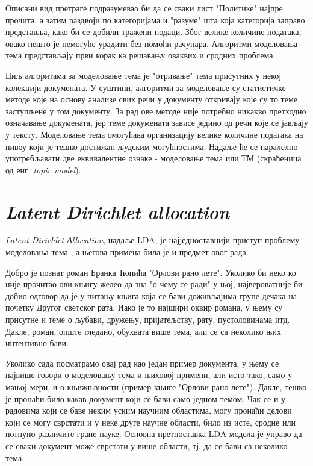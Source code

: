 Описани вид претраге подразумевао би да се сваки лист "Политике" најпре прочита, а затим  раздвоји по категоријама и "разуме" шта која категорија заправо представља, како би се добили тражени подаци. Због велике количине података, овако нешто је немогуће урадити без помоћи рачунара. Алгоритми моделовања тема представљају први корак ка решавању оваквих и сродних проблема.

Циљ алгоритама за моделовање тема је "отривање" тема присутних у некој колекцији докумената. У суштини, алгоритми за моделовање су статистичке методе које на основу анализе свих речи у документу откривају које су то теме заступљене у том документу. За рад ове методе није потребно никакво претходно означавање докумената, јер теме докумената зависе једино од речи које се јављају у тексту. Моделовање тема омогућава организацију велике количине података на нивоу који је тешко достижан људским могућностима. Надаље ће се паралелно употребљавати две еквивалентне ознаке - моделовање тема или ТМ (скраћеница од енг. \textit{topic model}).

\section{\textit{Latent Dirichlet allocation}}
 
\textit{Latent Dirichlet Аllocation}, надаље LDA, је најједноставнији приступ проблему моделовања тема \cite{blei1}, а његова  примена била је и предмет овог рада.

Добро је познат роман Бранка Ћопића "Орлови рано лете". Уколико би неко ко није прочитао ови књигу желео да зна "о чему се ради" у њој, највероватније би добио одговор да је у питању књига која се бави доживљајима групе дечака на почетку Другог светског рата. Иако је то најшири оквир романа, у њему су присутне и теме о  љубави, дружењу, пријатељству, рату, пустоловинама итд. Дакле, роман, опште гледано, обухвата више тема, али се са неколико њих интензивно бави.

Уколико сада посматрамо овај рад као један пример документа, у њему се највише говори о моделовању тема и њиховој примени, али исто тако, само у мањој мери, и о  књижњвности (пример књиге "Орлови рано лете").
Дакле, тешко је пронаћи било какав документ који се бави само једном темом. Чак се и у радовима који се баве неким уским научним областима, могу пронаћи делови који се могу сврстати и у неке друге научне области, било из исте, сродне или потпуно различите гране науке. Основна претпоставка  LDA модела је управо да се сваки документ може сврстати у више области, тј. да се бави са неколико тема.

